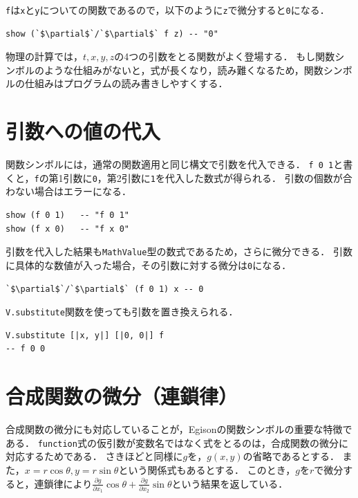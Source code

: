 \lstinline{f}は\lstinline{x}と\lstinline{y}についての関数であるので，以下のように\lstinline{z}で微分すると\lstinline{0}になる．

\begin{lstlisting}[language=egison,numbers=none]
show (`$\partial$`/`$\partial$` f z) -- "0"
\end{lstlisting}

物理の計算では，$t,x,y,z$の4つの引数をとる関数がよく登場する．
もし関数シンボルのような仕組みがないと，式が長くなり，読み難くなるため，関数シンボルの仕組みはプログラムの読み書きしやすくする．

\section{引数への値の代入}\label{funcsym-apply}

関数シンボルには，通常の関数適用と同じ構文で引数を代入できる．
\lstinline{f 0 1}と書くと，\lstinline{f}の第1引数に\lstinline{0}，第2引数に\lstinline{1}を代入した数式が得られる．
引数の個数が合わない場合はエラーになる．

\begin{lstlisting}[language=egison,numbers=none]
show (f 0 1)   -- "f 0 1"
show (f x 0)   -- "f x 0"
\end{lstlisting}

引数を代入した結果も\lstinline{MathValue}型の数式であるため，さらに微分できる．
引数に具体的な数値が入った場合，その引数に対する微分は\lstinline{0}になる．

\begin{lstlisting}[language=egison,numbers=none]
`$\partial$`/`$\partial$` (f 0 1) x -- 0
\end{lstlisting}

\lstinline{V.substitute}関数を使っても引数を置き換えられる．

\begin{lstlisting}[language=egison,numbers=none]
V.substitute [|x, y|] [|0, 0|] f
-- f 0 0
\end{lstlisting}

\section{合成関数の微分（連鎖律）}\label{funcsym-chain}

合成関数の微分にも対応していることが，Egisonの関数シンボルの重要な特徴である．
\lstinline{function}式の仮引数が変数名ではなく式をとるのは，合成関数の微分に対応するためである．
さきほどと同様に$g$を，$g(x,y)$の省略であるとする．
また，$x=r \cos \theta, y= r \sin \theta$という関係式もあるとする．
このとき，$g$を$r$で微分すると，連鎖律により$\frac{\partial g}{\partial x_1} \cos \theta + \frac{\partial g}{\partial x_2} \sin \theta$という結果を返している．

